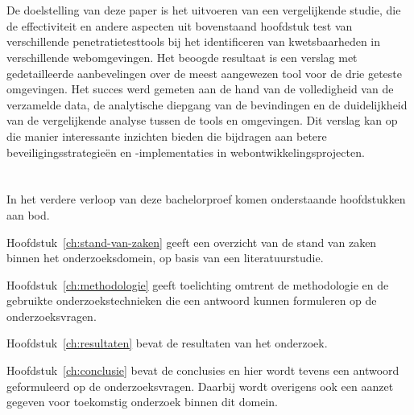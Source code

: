\section{}%
\label{sec:onderzoeksdoelstelling}
De doelstelling van deze paper is het uitvoeren van een vergelijkende studie, die de effectiviteit en andere aspecten uit bovenstaand hoofdstuk 
test van verschillende penetratietesttools bij het identificeren van kwetsbaarheden in verschillende webomgevingen.
Het beoogde resultaat is een verslag met gedetailleerde aanbevelingen over de meest aangewezen tool voor de drie geteste 
omgevingen. Het succes werd gemeten aan de hand van de volledigheid van de verzamelde data, de analytische diepgang van de bevindingen 
en de duidelijkheid van de vergelijkende analyse tussen de tools en omgevingen. Dit verslag kan op die manier interessante inzichten bieden die 
bijdragen aan betere beveiligingsstrategieën en -implementaties in webontwikkelingsprojecten.
\section{}%
\label{sec:opzet-bachelorproef}


In het verdere verloop van deze bachelorproef komen onderstaande hoofdstukken aan bod.

Hoofdstuk~\ref{ch:stand-van-zaken} geeft een overzicht van de stand van zaken binnen het onderzoeksdomein, op basis van een literatuurstudie.

Hoofdstuk~\ref{ch:methodologie} geeft toelichting omtrent de methodologie en de gebruikte onderzoekstechnieken die een antwoord kunnen formuleren op de onderzoeksvragen.

Hoofdstuk~\ref{ch:resultaten} bevat de resultaten van het onderzoek.

Hoofdstuk~\ref{ch:conclusie} bevat de conclusies en hier wordt tevens een antwoord geformuleerd op de onderzoeksvragen. Daarbij wordt overigens ook een aanzet gegeven voor toekomstig onderzoek binnen dit domein.